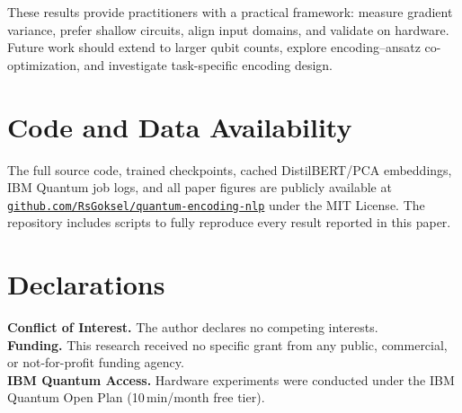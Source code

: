 \documentclass[conference,onecolumn,11pt]{IEEEtran}
\begin{document}
These results provide practitioners with a practical framework: measure gradient variance, prefer shallow circuits, align input domains, and validate on hardware. Future work should extend to larger qubit counts, explore encoding--ansatz co-optimization, and investigate task-specific encoding design.

\section*{Code and Data Availability}
The full source code, trained checkpoints, cached DistilBERT/PCA embeddings, IBM Quantum job logs, and all paper figures are publicly available at
\href{https://github.com/RsGoksel/quantum-encoding-nlp}{\texttt{github.com/RsGoksel/quantum-encoding-nlp}}
under the MIT License. The repository includes scripts to fully reproduce every result reported in this paper.

\section*{Declarations}
\textbf{Conflict of Interest.} The author declares no competing interests.\\
\textbf{Funding.} This research received no specific grant from any public, commercial, or not-for-profit funding agency.\\
\textbf{IBM Quantum Access.} Hardware experiments were conducted under the IBM Quantum Open Plan (10\,min/month free tier).
\end{document}
